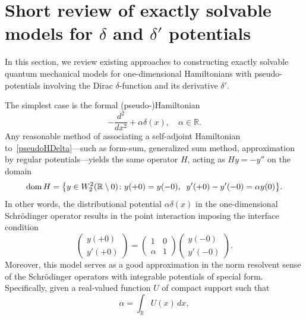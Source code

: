 \documentclass[reqno]{amsart}
\theoremstyle{definition}
\theoremstyle{remark}
\numberwithin{equation}{section}
\newcommand{\dmn}{\mathop{\rm dom}}
\newcommand{\Real}{\mathbb R}
\begin{document}

\section{Short review of exactly solvable models for $\delta$ and $\delta'$ potentials}\label{sec:review}


In this section, we review existing approaches to constructing exactly solvable quantum mechanical models for one-dimensional Hamiltonians with pseudo-potentials involving the Dirac $\delta$-function and its derivative $\delta'$.

The simplest case is the formal (pseudo-)Hamiltonian
\begin{equation}\label{pseudoHDelta}
	- \frac{d^2}{dx^2} + \alpha \delta(x),\quad \alpha\in\Real.
\end{equation}
Any reasonable method of associating a self-adjoint Hamiltonian to~\eqref{pseudoHDelta}---such as form-sum, generalized sum method, appro\-xi\-mation by regular potentials---yields the same operator $H$, acting as $H y = - y''$ on the domain
\begin{equation*}
	\dmn H = \big\{y\in W^2_2(\Real\setminus{0}) \colon y(+0)=y(-0),\;\; y'(+0) - y'(-0) = \alpha y(0)\big\}.
\end{equation*}
In other words, the distributional potential $\alpha\delta(x)$ in the one-dimensional Schr\"odinger operator results in the point interaction imposing the interface condition
\begin{equation}\label{DeltaPointInteraction}
\begin{pmatrix}
  y(+0)\\y'(+0)
\end{pmatrix}=
\begin{pmatrix}
  1& 0\\
  \alpha & 1
\end{pmatrix}
\begin{pmatrix}
  y(-0)\\y'(-0)
\end{pmatrix}.
\end{equation}
Moreover, this model serves as a good approximation in the norm resolvent sense of the Schr\"odinger operators with integrable potentials of special form. Specifically, given a real-valued function $U$ of compact support such that
\begin{equation*}
    \alpha=\int_{\Real} U(x)\,dx,
\end{equation*}
\end{document}
